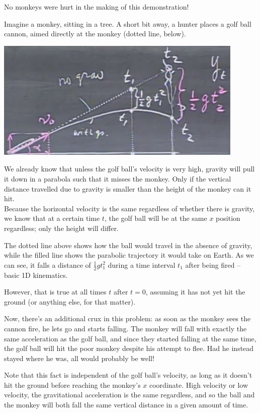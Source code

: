 \documentclass[12pt,a4paper]{report}
\begin{document}
No monkeys were hurt in the making of this demonstration!

Imagine a monkey, sitting in a tree. A short bit away, a hunter places a golf ball cannon, aimed directly at the monkey (dotted line, below).

\begin{center}
\includegraphics[scale=0.8]{Graphics/lec4_monkey}
\end{center}

We already know that unless the golf ball's velocity is very high, gravity will pull it down in a parabola such that it misses the monkey. Only if the vertical distance travelled due to gravity is smaller than the height of the monkey can it hit.\\
Because the horizontal velocity is the same regardless of whether there is gravity, we know that at a certain time $t$, the golf ball will be at the same $x$ position regardless; only the height will differ.

The dotted line above shows how the ball would travel in the absence of gravity, while the filled line shows the parabolic trajectory it would take on Earth. As we can see, it falls a distance of $\frac{1}{2} g t_1^2$ during a time interval $t_1$ after being fired -- basic 1D kinematics.

However, that is true at all times $t$ after $t = 0$, assuming it has not yet hit the ground (or anything else, for that matter).

Now, there's an additional crux in this problem: as soon as the monkey sees the cannon fire, he lets go and starts falling. The monkey will fall with exactly the same acceleration as the golf ball, and since they started falling at the same time, the golf ball will hit the poor monkey despite his attempt to flee. Had he instead stayed where he was, all would probably be well!

Note that this fact is independent of the golf ball's velocity, as long as it doesn't hit the ground before reaching the monkey's $x$ coordinate. High velocity or low velocity, the gravitational acceleration is the same regardless, and so the ball and the monkey will both fall the same vertical distance in a given amount of time.
\end{document}
